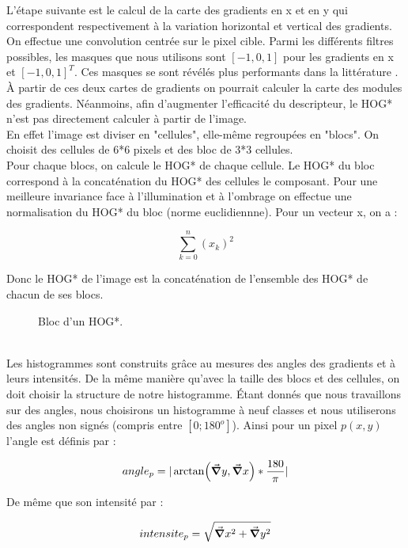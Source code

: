 L'étape suivante est le calcul de la carte des gradients en x et en y qui correspondent respectivement à la variation horizontal et vertical des gradients. On effectue une convolution centrée sur le pixel cible. Parmi les différents filtres possibles, les masques que nous utilisons sont $[-1, 0, 1]$ pour les gradients en x et $[-1, 0, 1]^T$. Ces masques se sont révélés plus performants dans la littérature \cite{dalal_histograms_2005}.\\

À partir de ces deux cartes de gradients on pourrait calculer la carte des modules des gradients. Néanmoins, afin d'augmenter l'efficacité du descripteur, le HOG* n'est pas directement calculer à partir de l'image.\\

En effet l'image est diviser en "cellules", elle-même regroupées en "blocs". On choisit des cellules de 6*6 pixels et des bloc de 3*3 cellules.\\

Pour chaque blocs, on calcule le HOG* de chaque cellule. Le HOG* du bloc correspond à la concaténation du HOG* des cellules le composant. Pour une meilleure invariance face à l'illumination et à l'ombrage on effectue une normalisation du HOG* du bloc (norme euclidiennne). Pour un vecteur x, on a :

\[ \sum_{k=0}^{n} (x_k)^2 \]

Donc le HOG* de l'image est la concaténation de l'ensemble des HOG* de chacun de ses blocs.

\begin{figure}[!htbp]
\center
\caption{Bloc d'un HOG*.}
\label{fig:cuttlefish_bloccells}
\end{figure}
\\

Les histogrammes sont construits grâce au mesures des angles des gradients et à leurs intensités. De la même manière qu'avec la taille des blocs et des cellules, on doit choisir la structure de notre histogramme. Étant donnés que nous travaillons sur des angles, nous choisirons un histogramme à neuf classes et nous utiliserons des angles non signés (compris entre $[0; 180^o]$).
Ainsi pour un pixel $p(x,y)$ l'angle est définis par :

\[ angle_p = |\arctan (\grad y, \grad x)*\frac{180}{\pi}| \]

De même que son intensité par :

\[ intensite_p = \sqrt{\grad x^2 + \grad y^2} \]

